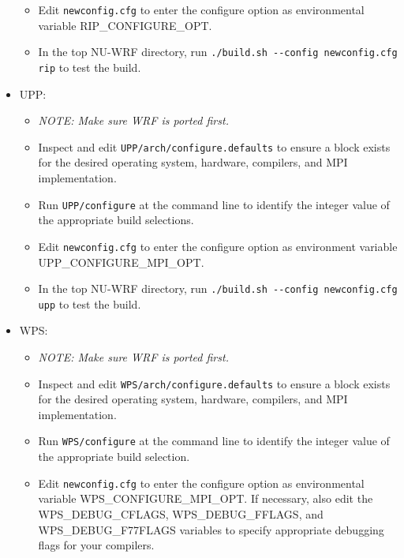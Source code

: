 \begin{itemize}
\begin{itemize}
  \item Edit \texttt{newconfig.cfg} to enter the configure option as
    environmental variable RIP\_CONFIGURE\_OPT.

  \item In the top NU-WRF directory, run 
    \texttt{./build.sh -\--config \mbox{newconfig.cfg} rip} to test the 
    build.

  \end{itemize}

\item UPP:
  \begin{itemize}

  \item \emph{NOTE: Make sure WRF is ported first.}

  \item Inspect and edit \texttt{UPP/arch/configure.defaults} to ensure a 
    block exists for the desired operating system, hardware, compilers, 
    and MPI implementation. 

  \item Run \texttt{UPP/configure} at the command line to identify the integer
    value of the appropriate build selections.

  \item Edit \texttt{newconfig.cfg} to enter the configure option as
    environment variable UPP\_CONFIGURE\_MPI\_OPT. 

  \item In the top NU-WRF directory, run 
    \texttt{./build.sh -\--config \mbox{newconfig.cfg} upp} to test the build.

  \end{itemize}

\item WPS:
  \begin{itemize}

  \item \emph{NOTE: Make sure WRF is ported first.}

  \item Inspect and edit \texttt{WPS/arch/configure.defaults} to ensure a 
    block exists for the desired operating system, hardware, compilers, 
    and MPI implementation.

  \item Run \texttt{WPS/configure} at the command line to identify the integer
    value of the appropriate build selection.

  \item Edit \texttt{newconfig.cfg} to enter the configure option as
    environmental variable WPS\_CONFIGURE\_MPI\_OPT.  If necessary, also edit
    the WPS\_DEBUG\_CFLAGS, WPS\_DEBUG\_FFLAGS, and WPS\_DEBUG\_F77FLAGS
    variables to specify appropriate debugging flags for your compilers.


\end{itemize}
\end{itemize}
